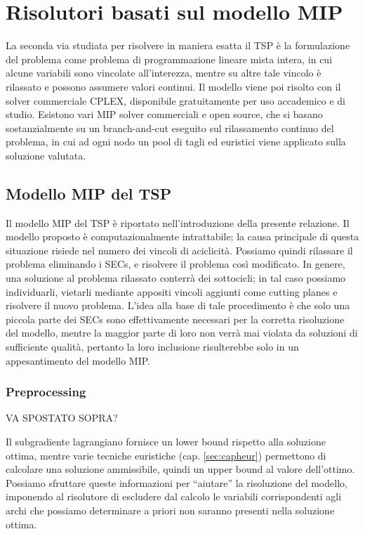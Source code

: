 \chapter{Risolutori basati sul modello MIP}
La seconda via studiata per risolvere in maniera esatta il TSP è la formulazione del problema come problema di programmazione lineare mista intera, in cui alcune variabili sono vincolate all'interezza, mentre su altre tale vincolo è rilassato e possono assumere valori continui. Il modello viene poi risolto con il solver commerciale CPLEX, disponibile gratuitamente per uso accademico e di studio. Esistono vari MIP solver commerciali e open source, che si basano sostanzialmente su un branch-and-cut eseguito sul rilassamento continuo del problema, in cui ad ogni nodo un pool di tagli ed euristici viene applicato sulla soluzione valutata.

\section{Modello MIP del TSP}\label{sec:relaxelsecs}
Il modello MIP del TSP è riportato nell'introduzione della presente relazione. Il modello proposto è computazionalmente intrattabile; la causa principale di questa situazione risiede nel numero dei vincoli di aciclicità. Possiamo quindi rilassare il problema eliminando i SECs, e risolvere il problema così modificato. In genere, una soluzione al problema rilassato conterrà dei sottocicli; in tal caso possiamo individuarli, vietarli mediante appositi vincoli aggiunti come cutting planes e risolvere il nuovo problema. L'idea alla base di tale procedimento è che solo una piccola parte dei SECs sono effettivamente necessari per la corretta risoluzione del modello, mentre la maggior parte di loro non verrà mai violata da soluzioni di sufficiente qualità, pertanto la loro inclusione risulterebbe solo in un appesantimento del modello MIP.

\subsection{Preprocessing}
VA SPOSTATO SOPRA?

Il subgradiente lagrangiano fornisce un lower bound rispetto alla soluzione ottima, mentre varie tecniche euristiche (cap. \ref{sec:capheur}) permettono di calcolare una soluzione ammissibile, quindi un upper bound al valore dell'ottimo. Possiamo sfruttare queste informazioni per ``aiutare'' la risoluzione del modello, imponendo al risolutore di escludere dal calcolo le variabili corrispondenti agli archi che possiamo determinare a priori non saranno presenti nella soluzione ottima.

